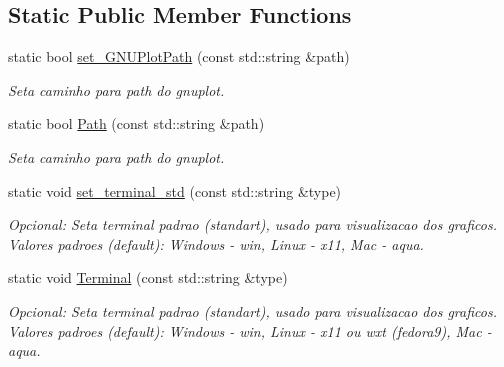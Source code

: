 \subsection*{Static Public Member Functions}
\begin{DoxyCompactItemize}
\item 
\hypertarget{classGnuplot_a67cae885c26ced821e335d98986f1967}{static bool \hyperlink{classGnuplot_a67cae885c26ced821e335d98986f1967}{set\-\_\-\-G\-N\-U\-Plot\-Path} (const std\-::string \&path)}\label{classGnuplot_a67cae885c26ced821e335d98986f1967}

\begin{DoxyCompactList}\small\item\em Seta caminho para path do gnuplot. \end{DoxyCompactList}\item 
\hypertarget{classGnuplot_a3920eab5d6595ea80d4bc4f72b06dab1}{static bool \hyperlink{classGnuplot_a3920eab5d6595ea80d4bc4f72b06dab1}{Path} (const std\-::string \&path)}\label{classGnuplot_a3920eab5d6595ea80d4bc4f72b06dab1}

\begin{DoxyCompactList}\small\item\em Seta caminho para path do gnuplot. \end{DoxyCompactList}\item 
\hypertarget{classGnuplot_a21feba7a3916708b742c3dc25850ab2f}{static void \hyperlink{classGnuplot_a21feba7a3916708b742c3dc25850ab2f}{set\-\_\-terminal\-\_\-std} (const std\-::string \&type)}\label{classGnuplot_a21feba7a3916708b742c3dc25850ab2f}

\begin{DoxyCompactList}\small\item\em Opcional\-: Seta terminal padrao (standart), usado para visualizacao dos graficos. Valores padroes (default)\-: Windows -\/ win, Linux -\/ x11, Mac -\/ aqua. \end{DoxyCompactList}\item 
\hypertarget{classGnuplot_a4039b0fdcf0e3fbf97dac187825138fb}{static void \hyperlink{classGnuplot_a4039b0fdcf0e3fbf97dac187825138fb}{Terminal} (const std\-::string \&type)}\label{classGnuplot_a4039b0fdcf0e3fbf97dac187825138fb}

\begin{DoxyCompactList}\small\item\em Opcional\-: Seta terminal padrao (standart), usado para visualizacao dos graficos. Valores padroes (default)\-: Windows -\/ win, Linux -\/ x11 ou wxt (fedora9), Mac -\/ aqua. \end{DoxyCompactList}\end{DoxyCompactItemize}


